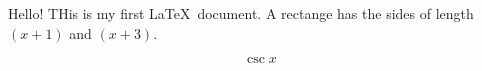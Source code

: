 \documentclass[11pt]{article}
\begin{document}
Hello! THis is my first \LaTeX\ document.
A rectange has the sides of length $(x+1)$ and $(x+3)$.










$$\csc x$$
\end{document}

